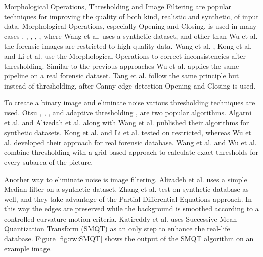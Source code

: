 \documentclass[draft,final]{vutinfth} %
\begin{document}
\par
Morphological Operations, Thresholding and Image Filtering are popular techniques for improving the quality of both kind, realistic and synthetic, of input data.
Morphological Operations, especially Opening and Closing, is used in many cases \cite{wang2014automatic}, \cite{kong2014novel}, \cite{li2014retrieval}, \cite{tang2010footwear}, \cite{wu2019crime}, where Wang et al. \cite{wang2014automatic} uses a synthetic dataset, and other than Wu et al. \cite{wu2019crime} the forensic images are restricted to high quality data.
Wang et al. \cite{wang2014automatic}, Kong et al.  \cite{kong2014novel} and Li et al. \cite{li2014retrieval} use the Morphological Operations to correct inconsistencies after thresholding.
Similar to the previous approaches Wu et al. \cite{wu2019crime} applies the same pipeline on a real forensic dataset.
Tang et al. \cite{tang2010footwear} follow the same principle but instead of thresholding, after Canny edge detection Opening and Closing is used.
\par
To create a binary image and eliminate noise various thresholding techniques are used.
Otsu  \cite{wu2019crime}, \cite{algarni2008novel}, \cite{alizadeh2017automatic}, \cite{kong2014novel} and adaptive thresholding \cite{wang2014automatic}, \cite{li2014retrieval} are two popular algorithms.
Algarni et al. \cite{algarni2008novel} and Alizedah et al. \cite{alizadeh2017automatic} along with Wang et al. \cite{wang2014automatic} published their algorithms for synthetic datasets.
Kong et al. \cite{kong2014novel} and Li et al. \cite{li2014retrieval} tested on restricted, whereas Wu et al. \cite{wu2019crime} developed their approach for real forensic database.
Wang et al. \cite{wang2014automatic} and Wu et al. \cite{wu2019crime} combine thresholding with a grid based approach to calculate exact thresholds for every subarea of the picture.
\par
Another way to eliminate noise is image filtering.
Alizadeh et al. \cite{alizadeh2017automatic} uses a simple Median filter on a synthetic dataset.
Zhang et al. \cite{zhang2005automatic} test on synthetic database as well, and they take advantage of the Partial Differential Equations approach.
In this way the edges are preserved while the background is smoothed according to a controlled curvature motion criteria. 
Katireddy et al. \cite{katireddy2017novel} uses Successive Mean Quantization Transform (SMQT) \cite{nilsson2013smqt} as an only step to enhance the real-life database.
Figure \ref{fig:rw:SMQT} shows the output of the SMQT algorithm on an example image.
\end{document}
